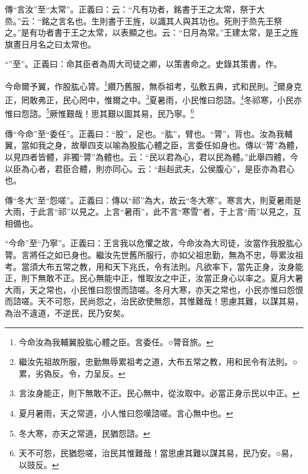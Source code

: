 {\noindent\zhuan{}\fzbyks 傳“言汝”至“太常”。正義曰：云：“凡有功者，銘書于王之太常，祭于大烝。”云：“銘之言名也。生則書于王旌，以識其人與其功也。死則于烝先王祭之。”是有功者書于王之太常，以表顯之也。云：“日月為常。”王建太常，是王之旌旗晝日月名之曰太常也。 \par}

{\noindent\shu{}\fzkt “”至”。正義曰：命其臣者為周大司徒之卿，以策書命之。史錄其策書，作。 \par}

今命爾予翼，作股肱心膂。\footnote{今命汝為我輔翼股肱心體之臣。言委任。○膂音旅。}纘乃舊服，無忝祖考，弘敷五典，式和民則。\footnote{繼汝先祖故所服，忠勤無辱累祖考之道，大布五常之教，用和民令有法則。○累，劣偽反。令，力呈反。}爾身克正，罔敢弗正，民心罔中，惟爾之中。\footnote{言汝身能正，則下無敢不正。民心無中，從汝取中。必當正身示民以中正。}夏暑雨，小民惟曰怨諮。\footnote{夏月暑雨，天之常道，小人惟曰怨嘆諮嗟。言心無中也。}冬祁寒，小民亦惟曰怨諮。\footnote{冬大寒，亦天之常道，民猶怨諮。}厥惟艱哉！思其艱以圖其易，民乃寧。\footnote{天不可怨，民猶怨嗟，治民其惟難哉！當思慮其難以謀其易，民乃安。○易，以豉反。}


{\noindent\zhuan{}\fzbyks 傳“今命”至“委任”。正義曰：“股”，足也。“肱”，臂也。“膂”，背也。汝為我輔翼，當如我之身，故舉四支以喻為股肱心體之臣，言委任如身也。傳以“膂”為體，以見四者皆體，非獨“膂”為體也。云：“民以君為心，君以民為體。”此舉四體，今以臣為心者，君臣合體，則亦同心。云：“赳赳武夫，公侯腹心”，是臣亦為君心也。 \par}

{\noindent\zhuan{}\fzbyks 傳“冬大”至“怨嗟”。正義曰：傳以“祁”為大，故云“冬大寒”。寒言大，則夏暑雨是大雨，于此言“祁”以見之。上言“暑雨”，此不言“寒雪”者，于上言“雨”以見之，互相備也。 \par}

{\noindent\shu{}\fzkt “今命”至“乃寧”。正義曰：王言我以危懼之故，今命汝為大司徒，汝當作我股肱心膂。言將任之如已身也。繼汝先世舊所服行，亦如父祖忠勤，無為不忠，辱累汝祖考。當須大布五常之教，用和天下兆氏，令有法則。凡欲率下，當先正身，汝身能正，則下無敢不正。民心無能中正，惟取汝之中正，汝當正身心以率之。夏月大暑大雨，天之常也，小民惟曰怨恨而諮嗟。冬月大寒，亦天之常也，小民亦惟曰怨恨而諮嗟。天不可怨，民尚怨之，治民欲使無怨，其惟難哉！思慮其難，以謀其易，為治不違道，不逆民，民乃安矣。 \par}


